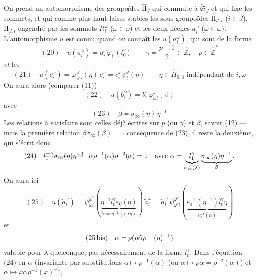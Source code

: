 \documentclass[11pt,a4paper]{article}
\begin{document}
On prend un automorphisme  des groupoïdes $\widehat{\mathrm{II}}_J$ qui commute à $\widetilde{\mathfrak{S}}_J$ et qui fixe les sommets, et qui comme plus haut laisse stables les sous-groupoïdes $\widehat{\mathrm{II}}_{J,i}$ ($i \in J$),  $\mathrm{II}_{J,i}$ engendré par les  sommets $R_i^{\omega}$ ($\omega \in \underline{\omega}$) et les deux flèches $a_i^{\omega}$ ($\omega \in \underline{\omega}$). \struck{\ill{}} L'automorphisme $u$ est connu quand on connaît les $u(a_i^{\omega})$, qui sont de la forme
\[
(20)\quad u(a_i^{\omega}) = a_i^{\omega} \varphi_i^{\omega}(l_0^{\gamma})
\qquad \gamma = \frac{p-1}{2} \in \hat{\mathbb{Z}}, \quad p \in \hat{\mathbb{Z}}^{*}
\]
\emph{et} les
\[
(21)\quad u(c_i^{\omega}) = \varphi^{\omega'}_{\omega' i}(\eta)\, c_i^{\omega} = c_i^{\omega} \psi_i^{\omega}(\eta)
\qquad \eta \in \widehat{\Pi}_{0,3} \text{ indépendant de } i, \omega
\]
On aura alors (comparer (11))
\[
(22)\quad u(b_i^{\omega}) = b_i^{\omega} \varphi^{\omega}_{\omega i}(\beta)
\]
avec
\[
(23)\quad \beta = \sigma_\infty(\eta)\, \eta^{-1}
\]
Les relations à satisfaire sont celles déjà écrites sur $p$ (ou $\gamma$) et $\beta$, savoir (12) — mais la première relation $\beta\sigma_\infty(\beta) = 1$  conséquence de (23), il reste la deuxième, qui s'écrit donc
\[
(24)\quad \text{\struck{$l_1^{-\gamma}\sigma_\infty(\eta)\eta^{-1}$}}\ \ \alpha \rho^{-1}(\alpha) \rho^{-2}(\alpha) = 1
\quad \text{avec } \alpha = \underbrace{l_1^{\gamma}}_{\sigma_\infty(\lambda)} \underbrace{\sigma_\infty(\eta)\eta^{-1}}_{\beta}.
\]
On aura ici
\[
(25)\quad u(\tilde a_i^{\omega}) = \psi^{\omega^*}_{\omega i}(\underbrace{\eta^{-1} l_0^{\gamma} \varepsilon_0(\eta)}_{\tilde\alpha = \eta^{-1}\varepsilon_0(\lambda\eta)})\, \tilde a_i^{\omega}
= \tilde a_i^{\omega}\, \psi^{\omega'}_{\omega' i}(\underbrace{\varepsilon_0^{-1}(\eta^{-1}) l_0^{\gamma} \eta}_{\varepsilon_0^{-1}(\tilde\alpha)})
\]
et
\[
(\text{25\,bis})\quad \alpha = \rho(\eta \tilde\alpha \rho^{-1}(\eta)^{-1})
\]
valable pour $\lambda$ quelconque, pas nécessairement de la forme $l_0^{\gamma}$. \struck{\ill{}} Dans l'équation (24) en $\alpha$ (invariante par substitutions $\alpha \mapsto \rho^{-1}(\alpha)$ (ou $\alpha \mapsto \rho\alpha = \rho^{-2}(\alpha)$) et $\alpha \mapsto x\alpha\rho^{-1}(x)^{-1}$,
\end{document}
